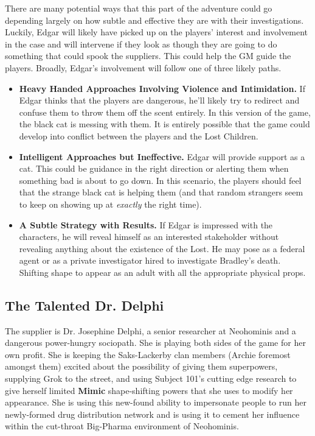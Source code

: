 \documentclass[letterpaper,serif]{rpg-module}
\begin{document}
There are many potential ways that this part of the adventure could go depending largely on how subtle and effective they are with their investigations. Luckily, Edgar will likely have picked up on the players' interest and involvement in the case and will intervene if they look as though they are going to do something that could spook the suppliers. This could help the GM guide the players. Broadly, Edgar's involvement will follow one of three likely paths. 

\begin{itemize}
	\item \textbf{Heavy Handed Approaches Involving Violence and Intimidation.} If Edgar thinks that the players are dangerous, he'll likely try to redirect and confuse them to throw them off the scent entirely. In this version of the game, the black cat is messing with them. It is entirely possible that the game could develop into conflict between the players and the Lost Children. 
    \item \textbf{Intelligent Approaches but Ineffective.} Edgar will provide support as a cat. This could be guidance in the right direction or alerting them when something bad is about to go down. In this scenario, the players should feel that the strange black cat is helping them (and that random strangers seem to keep on showing up at \emph{exactly} the right time).
    \item \textbf{A Subtle Strategy with Results.} If Edgar is impressed with the characters, he will reveal himself as an interested stakeholder without revealing anything about the existence of the Lost. He may pose as a federal agent or as a private investigator hired to investigate Bradley's death. Shifting shape to appear as an adult with all the appropriate physical props.
\end{itemize}


\subsection{ The Talented Dr. Delphi }


The supplier is Dr. Josephine Delphi, a senior researcher at Neohominis and a dangerous power-hungry sociopath. She is playing both sides of the game for her own profit. She is keeping the Saks-Lackerby clan members (Archie foremost amongst them) excited about the possibility of giving them superpowers, supplying Grok to the street, and using Subject 101's cutting edge research to give herself limited \textbf{Mimic} shape-shifting powers that she uses to modify her appearance. She is using this new-found ability to impersonate people to run her newly-formed drug distribution network and is using it to cement her influence within the cut-throat Big-Pharma environment of Neohominis.  
\end{document}
